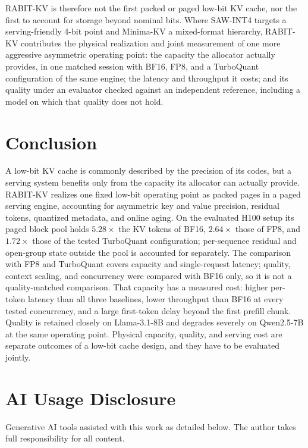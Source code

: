 \documentclass{article}
\begin{document}
RABIT-KV is therefore not the first packed or paged low-bit KV cache, nor the first to account for
storage beyond nominal bits. Where SAW-INT4 targets a serving-friendly 4-bit point and Minima-KV a
mixed-format hierarchy, RABIT-KV contributes the physical realization and joint measurement of one more
aggressive asymmetric operating point: the capacity the allocator actually provides, in one matched session with
BF16, FP8, and a TurboQuant configuration of the same engine; the latency and throughput it costs; and
its quality under an evaluator checked against an independent reference, including a model on which
that quality does not hold.

\section{Conclusion}
\label{sec:conclusion}

A low-bit KV cache is commonly described by the precision of its codes, but a serving system benefits
only from the capacity its allocator can actually provide. RABIT-KV realizes one fixed low-bit
operating point as packed pages in a paged serving engine, accounting for asymmetric key and value
precision, residual tokens, quantized metadata, and online aging. On the evaluated H100 setup its
paged block pool holds $5.28\times$ the KV tokens of BF16, $2.64\times$ those of FP8, and $1.72\times$
those of the tested TurboQuant configuration; per-sequence residual and open-group state outside the
pool is accounted for separately. The comparison with FP8 and TurboQuant covers capacity and
single-request latency; quality, context scaling, and concurrency were compared with BF16 only, so it
is not a quality-matched comparison. That capacity has a measured cost: higher
per-token latency than all three baselines, lower throughput than BF16 at every tested concurrency,
and a large first-token delay beyond the first prefill chunk. Quality is retained closely on
Llama-3.1-8B and degrades severely on Qwen2.5-7B at the same operating point. Physical capacity,
quality, and serving cost are separate outcomes of a low-bit cache design, and they have to be
evaluated jointly.




\section*{AI Usage Disclosure}

Generative AI tools assisted with this work as detailed below. The author takes full responsibility for
all content.
\end{document}
